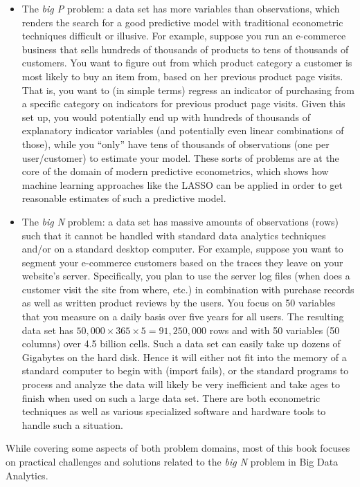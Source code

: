 \documentclass[
  12pt,
]{style/krantz}
\begin{document}
\begin{itemize}
\item
  The \emph{big P} problem: a data set has more variables than observations, which renders the search for a good predictive model with traditional econometric techniques difficult or illusive. For example, suppose you run an e-commerce business that sells hundreds of thousands of products to tens of thousands of customers. You want to figure out from which product category a customer is most likely to buy an item from, based on her previous product page visits. That is, you want to (in simple terms) regress an indicator of purchasing from a specific category on indicators for previous product page visits. Given this set up, you would potentially end up with hundreds of thousands of explanatory indicator variables (and potentially even linear combinations of those), while you ``only'' have tens of thousands of observations (one per user/customer) to estimate your model. These sorts of problems are at the core of the domain of modern predictive econometrics, which shows how machine learning approaches like the LASSO can be applied in order to get reasonable estimates of such a predictive model.
\item
  The \emph{big N} problem: a data set has massive amounts of observations (rows) such that it cannot be handled with standard data analytics techniques and/or on a standard desktop computer. For example, suppose you want to segment your e-commerce customers based on the traces they leave on your website's server. Specifically, you plan to use the server log files (when does a customer visit the site from where, etc.) in combination with purchase records as well as written product reviews by the users. You focus on 50 variables that you measure on a daily basis over five years for all users. The resulting data set has \(50,000 \times 365 \times 5=91,250,000\) rows and with 50 variables (50 columns) over 4.5 billion cells. Such a data set can easily take up dozens of Gigabytes on the hard disk. Hence it will either not fit into the memory of a standard computer to begin with (import fails), or the standard programs to process and analyze the data will likely be very inefficient and take ages to finish when used on such a large data set. There are both econometric techniques as well as various specialized software and hardware tools to handle such a situation.
\end{itemize}

While covering some aspects of both problem domains, most of this book focuses on practical challenges and solutions related to the \emph{big N} problem in Big Data Analytics.
\end{document}
